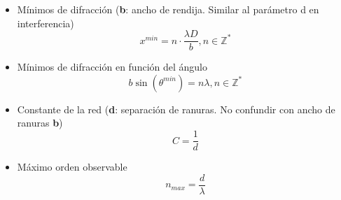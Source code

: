 \begin{itemize}
    \item Mínimos de difracción (\textbf{b}: ancho de rendija. Similar al parámetro d en interferencia)
    \begin{equation}
        x^{min} = n \cdot \frac{\lambda D}{b} , n \in \mathbb Z^*
    \end{equation}
    \item Mínimos de difracción en función del ángulo
    \begin{equation}
        b \sin(\theta^{min}) = n \lambda , n \in \mathbb Z^*
    \end{equation}
\end{itemize}

\begin{itemize}
    \item Constante de la red (\textbf{d}: separación de ranuras. No confundir con ancho de ranuras \textbf{b})
    \begin{equation}
        C = \frac{1}{d}
    \end{equation}
    \item Máximo orden observable
    \begin{equation}
        n_{max} = \frac{d}{\lambda}
    \end{equation}
\end{itemize}